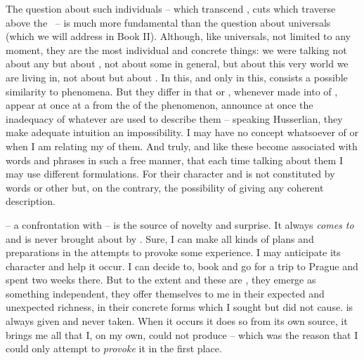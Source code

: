 The question about such individuals -- which transcend , {cuts}
which traverse  above the \hoa\ -- is much more fundamental than
the question about universals (which we will address in Book II). Although, like
universals, not
limited to any  moment, they are the most individual and concrete
things: we were talking not about 
any  but about , not about some
 in general, but about this very world we are living in, not about
 but about . In this, 
and only in this, consists a possible similarity to phenomena. But they differ
in that  or , whenever made into
 of 
, appear at once at a  from the  of
the phenomenon, announce at once the
inadequacy of whatever  are used to describe them -- speaking
Husserlian, they make adequate intuition an impossibility. 
I may have no  concept whatsoever of  or  when I am relating my  of them.  And
truly,  and  like these become associated with
words and phrases in such a free manner, that each time talking about them I may
use different formulations. For their character and  is not
constituted by words or other  but, on the contrary,
 the possibility of giving any coherent description.


%
\pa
{} -- a  confrontation with  -- is
the source of novelty and surprise. It always {\em comes to}  and
is never brought about by .
Sure, I can make all kinds of plans and preparations in the attempts to provoke
some experience.  I may anticipate its character and help it occur.  I can 
decide to, book and go for a trip to Prague and spent two weeks there. But to the
extent  and these  are , they
emerge as something independent, they offer themselves to me in their expected
and unexpected richness, in their concrete forms which I sought but did not
cause.   is always given and never taken.  When it occurs it
does so from its own source, it brings me all that I, on my own, could not
produce -- which was the reason that I could only attempt to {\em provoke} it in the
first place.

